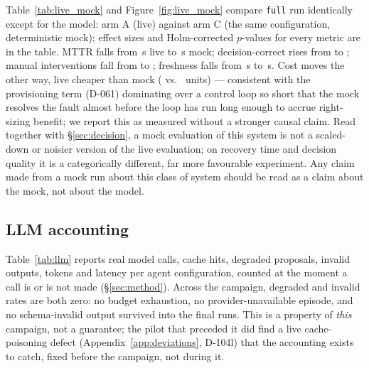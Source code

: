 Table~\ref{tab:live_mock} and Figure~\ref{fig:live_mock} compare \texttt{full} run identically except
for the model: arm A (live)
against arm C (the same configuration, deterministic mock); effect sizes and Holm-corrected
$p$-values for every metric are in the table. MTTR falls from \NLiveVsMockMttrSLive{}\,s live to
\NLiveVsMockMttrSMock{}\,s mock; decision-correct rises from \NLiveVsMockDecisionCorrectLive{} to
\NLiveVsMockDecisionCorrectMock{}; manual interventions fall from \NLiveVsMockManualInterventionsLive{}
to \NLiveVsMockManualInterventionsMock{}; freshness falls from \NLiveVsMockFreshnessSLive{}\,s to
\NLiveVsMockFreshnessSMock{}\,s. Cost moves the other way, live cheaper than mock
(\NLiveVsMockCostUnitsLive{} vs.\ \NLiveVsMockCostUnitsMock{} units) --- consistent with the
provisioning term (D-061) dominating over a control loop so short that the mock resolves the fault
almost before the loop has run long enough to accrue right-sizing benefit; we report this as measured
without a stronger causal claim. Read together with \S\ref{sec:decision}, a mock evaluation of this
system is not a scaled-down or noisier version of the live evaluation; on recovery time and decision
quality it is a categorically different, far more favourable experiment. Any claim made from a mock
run about this class of system should be read as a claim about the mock, not about the model.

\subsection{LLM accounting}

\begin{table}[t]
\centering
\caption{LLM accounting per agent configuration, counted at the moment a call is or is not made
  (\S\ref{sec:method}).}
\label{tab:llm}
\small

\end{table}

Table~\ref{tab:llm} reports real model calls, cache hits, degraded proposals, invalid outputs, tokens
and latency per agent configuration, counted at the moment a call is or is not made
(\S\ref{sec:method}). Across the campaign, degraded and invalid rates are both zero: no budget
exhaustion, no provider-unavailable episode, and no schema-invalid output survived into the final
runs. This is a property of \emph{this} campaign, not a guarantee; the pilot that preceded it did find
a live cache-poisoning defect (Appendix~\ref{app:deviations}, D-104l) that the accounting exists to
catch, fixed before the campaign, not during it.

